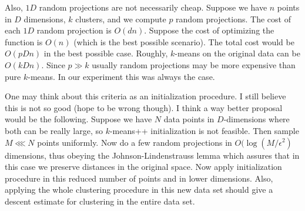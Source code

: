 \documentclass[aps,preprint,nofootinbib,floatfix]{revtex4-1}
\begin{document}
Also, $1D$ random projections are not necessarily cheap. Suppose we
have $n$ points in $D$ dimensions, 
$k$ clusters, and we compute $p$ random projections.
The cost of each $1D$ random projection is $O(d n)$. Suppose the cost
of optimizing the function is $O(n)$ (which is the best possible scenario).
The total cost would be $O(p D n)$ in the best possible case. Roughly,
$k$-means on the original data can be $O(k D n)$. Since $p \gg k$ usually
random projections may be more expensive than pure $k$-means.
In our experiment this was always the case.

One may think about this criteria as an initialization procedure. I still
believe this is not so good (hope to be wrong though).
I think a way better proposal would be the following.
Suppose we have $N$ data points in $D$-dimensions where both can be really
large, so $k$-means++ initialization is not feasible. Then sample
$M \lll N$ points uniformly. Now do a few random projections in
$O(\log(M / \epsilon^2)$ dimensions, thus obeying the Johnson-Lindenstrauss
lemma which assures that in this case we preserve distances in the original
space. Now apply initialization procedure in this reduced number of points and
in lower dimensions. Also, applying the whole clustering procedure in this
new data set should give a descent estimate for clustering in the entire
data set.
\end{document}
